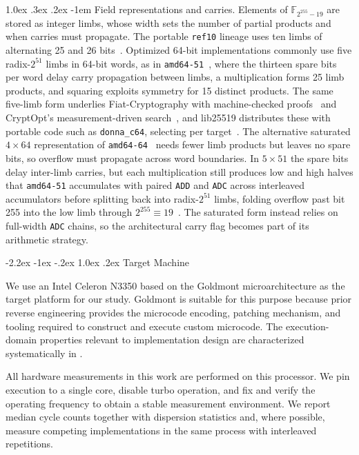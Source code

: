\documentclass[journal=tches,submission]{iacrtrans}
\makeatletter
\newcommand{\code}[1]{\texttt{#1}}
\renewcommand\subsection{\@startsection{subsection}{2}{\z@}%
      {-2.2ex \@plus -1ex \@minus -.2ex}%
      {1.0ex \@plus .2ex}%
      {\normalfont\large\bfseries\SS@subsectfont}}
\renewcommand\paragraph{\@startsection{paragraph}{4}{\z@}%
      {1.0ex \@plus .3ex \@minus .2ex}%
      {-1em}%
      {\normalfont\normalsize\bfseries\SS@parafont}}
\makeatother
\begin{document}
\paragraph{Field representations and carries.}
Elements of $\mathbb{F}_{2^{255}-19}$ are stored as integer limbs, whose width sets the number of partial products and when carries must propagate.
The portable \texttt{ref10} lineage uses ten limbs of alternating 25 and 26 bits~\cite{PKC:Bernstein06,lib25519}.
Optimized 64-bit implementations commonly use five radix-$2^{51}$ limbs in 64-bit words, as in \texttt{amd64-51}~\cite{bernsteinHighspeed2011}, where the thirteen spare bits per word delay carry propagation between limbs, a multiplication forms 25 limb products, and squaring exploits symmetry for 15 distinct products.
The same five-limb form underlies Fiat-Cryptography with machine-checked proofs~\cite{SP:EPGSC19} and CryptOpt's measurement-driven search~\cite{kuepperCryptOpt2023}, and lib25519 distributes these with portable code such as \texttt{donna\_c64}, selecting per target~\cite{lib25519}.
The alternative saturated $4\times64$ representation of \texttt{amd64-64}~\cite{bernsteinHighspeed2011} needs fewer limb products but leaves no spare bits, so overflow must propagate across word boundaries.
In $5\times51$ the spare bits delay inter-limb carries, but each multiplication still produces low and high halves that \texttt{amd64-51} accumulates with paired \code{ADD} and \code{ADC} across interleaved accumulators before splitting back into radix-$2^{51}$ limbs, folding overflow past bit 255 into the low limb through $2^{255}\equiv19$~\cite{bernsteinHighspeed2011,lib25519}.
The saturated form instead relies on full-width \code{ADC} chains, so the architectural carry flag becomes part of its arithmetic strategy.

\subsection{Target Machine}
\label{sec:target-machine}

We use an Intel Celeron N3350 based on the Goldmont microarchitecture as the target platform for our study.
Goldmont is suitable for this purpose because prior reverse engineering provides the microcode encoding, patching mechanism, and tooling required to construct and execute custom microcode.
The execution-domain properties relevant to implementation design are characterized systematically in .

All hardware measurements in this work are performed on this processor.
We pin execution to a single core, disable turbo operation, and fix and verify the operating frequency to obtain a stable measurement environment.
We report median cycle counts together with dispersion statistics and, where possible, measure competing implementations in the same process with interleaved repetitions.
\end{document}
